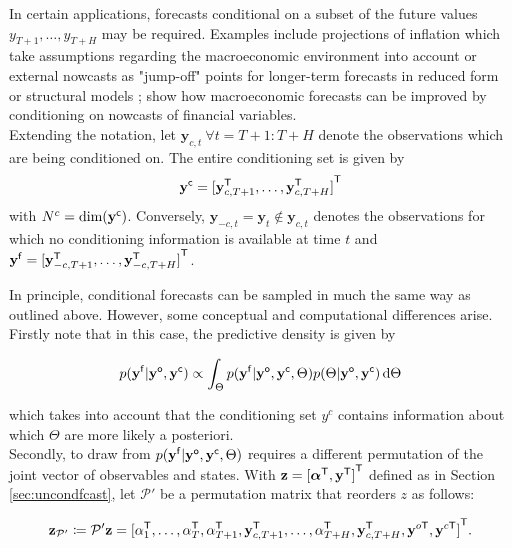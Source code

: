 \documentclass[notitlepage,a4paper,12pt]{article}
\newcommand{\transpose}[1]{{#1}^{\sf{T}}}
\begin{document}
In certain applications, forecasts conditional on a subset of the future values $y_{T+1}, \dots, y_{T+H}$ may be required. Examples include projections of inflation which take assumptions regarding the macroeconomic environment into account \citep{giannone_etal_2014_ijf} or external nowcasts as "jump-off" points for longer-term forecasts in reduced form or structural models \citep{faustwright2009_jbes,wolters2015_jae}; \citet{knotekzaman2019_ijof} show how macroeconomic forecasts can be improved by conditioning on nowcasts of financial variables.\\

Extending the notation, let $\mathbf{y}_{c,t}\: \forall t = T+1:T+H$ denote the observations which are being conditioned on. The entire conditioning set is given by 
$$
\mathbf{y}^{\sf{c}} = \transpose{[\mathbf{y}^{\sf{T}}_{c,T+1}, \dots, \mathbf{y}^{\sf{T}}_{c,T+H}]}
$$ 
with $N^c = \text{dim}(\mathbf{y}^{\sf{c}})$. Conversely, $\mathbf{y}_{-c,t} = \mathbf{y}_t\notin\mathbf{y}_{c,t}$ denotes the observations for which no conditioning information is available at time $t$ and $\mathbf{y}^{\sf{f}} = \transpose{[\mathbf{y}^{\sf{T}}_{-c,T+1}, \dots, \mathbf{y}^{\sf{T}}_{-c,T+H}]}$. 

In principle, conditional forecasts can be sampled in much the same way as outlined above. However, some conceptual and computational differences arise. Firstly note that in this case, the predictive density is given by

\begin{equation}\label{eqn:preddens_cond}    
    p(\mathbf{y^{\sf{f}}}|\mathbf{y^{\sf{o}}}, \mathbf{y^{\sf{c}}}) \propto \int_{\Theta} p(\mathbf{y^{\sf{f}}}|\mathbf{y^{\sf{o}}},\mathbf{y^{\sf{c}}}, \Theta) p(\Theta|\mathbf{y^{\sf{o}}}, \mathbf{y^{\sf{c}}})\, \text{d}\Theta
\end{equation}

which takes into account that the conditioning set $y^c$ contains information about which $\Theta$ are more likely a posteriori. \\

Secondly, to draw from $p(\mathbf{y^{\sf{f}}}|\mathbf{y^{\sf{o}}},\mathbf{y^{\sf{c}}}, \Theta)$ requires a different permutation of the joint vector of observables and states. With $\mathbf{z} = \transpose{[\transpose{\boldsymbol{\alpha}}, \transpose{\mathbf{y}}]}$ defined as in Section \ref{sec:uncondfcast}, let $\mathcal{P}'$ be a permutation matrix that reorders $z$ as follows:

$$
\mathbf{z}_{\mathcal{P}'} \coloneqq \mathcal{P}' \mathbf{z} =
 \transpose{[
     \alpha^{\sf{T}}_1, 
     \dots, 
     \alpha^{\sf{T}}_T, 
     \alpha^{\sf{T}}_{T+1}, 
     \mathbf{y}^{\sf{T}}_{c,T+1}, 
     \dots, 
     \alpha^{\sf{T}}_{T+H}, 
     \mathbf{y}^{\sf{T}}_{c,T+H},
     \mathbf{y}^{o\sf{T}},
     \mathbf{y}^{c\sf{T}}]}.
$$
\end{document}
